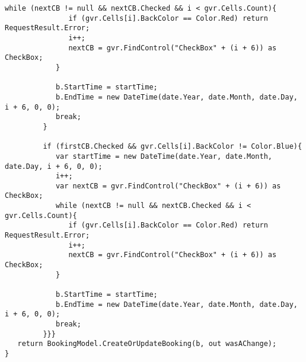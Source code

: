 \begin{lstlisting}[caption= ViewModel kode til oprettelse af booking]
            while (nextCB != null && nextCB.Checked && i < gvr.Cells.Count){
               if (gvr.Cells[i].BackColor == Color.Red) return RequestResult.Error;
               i++;
               nextCB = gvr.FindControl("CheckBox" + (i + 6)) as CheckBox;
            }

            b.StartTime = startTime;
            b.EndTime = new DateTime(date.Year, date.Month, date.Day, i + 6, 0, 0);
            break;
         }

         if (firstCB.Checked && gvr.Cells[i].BackColor != Color.Blue){
            var startTime = new DateTime(date.Year, date.Month, date.Day, i + 6, 0, 0);
            i++;
            var nextCB = gvr.FindControl("CheckBox" + (i + 6)) as CheckBox;
            while (nextCB != null && nextCB.Checked && i < gvr.Cells.Count){
               if (gvr.Cells[i].BackColor == Color.Red) return RequestResult.Error;
               i++;
               nextCB = gvr.FindControl("CheckBox" + (i + 6)) as CheckBox;
            }

            b.StartTime = startTime;
            b.EndTime = new DateTime(date.Year, date.Month, date.Day, i + 6, 0, 0);
            break;
         }}}
   return BookingModel.CreateOrUpdateBooking(b, out wasAChange);
}
\end{lstlisting}
